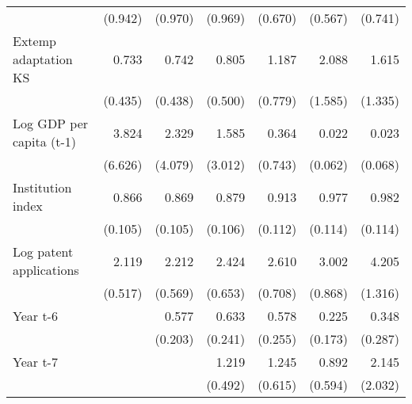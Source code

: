 \begin{table}[htbp]
\begin{tabular}{l*{6}{D{.}{.}{-1}}}
                    &     (0.942)         &     (0.970)         &     (0.969)         &     (0.670)         &     (0.567)         &     (0.741)         \\
\addlinespace
Extemp adaptation KS&       0.733         &       0.742         &       0.805         &       1.187         &       2.088         &       1.615         \\
                    &     (0.435)         &     (0.438)         &     (0.500)         &     (0.779)         &     (1.585)         &     (1.335)         \\
\addlinespace
Log GDP per capita (t-1)&       3.824         &       2.329         &       1.585         &       0.364         &       0.022         &       0.023         \\
                    &     (6.626)         &     (4.079)         &     (3.012)         &     (0.743)         &     (0.062)         &     (0.068)         \\
\addlinespace
Institution index   &       0.866         &       0.869         &       0.879         &       0.913         &       0.977         &       0.982         \\
                    &     (0.105)         &     (0.105)         &     (0.106)         &     (0.112)         &     (0.114)         &     (0.114)         \\
\addlinespace
Log patent applications&       2.119\sym{***}&       2.212\sym{***}&       2.424\sym{***}&       2.610\sym{***}&       3.002\sym{***}&       4.205\sym{***}\\
                    &     (0.517)         &     (0.569)         &     (0.653)         &     (0.708)         &     (0.868)         &     (1.316)         \\
\addlinespace
Year t-6            &                     &       0.577\sym{\%}  &       0.633         &       0.578         &       0.225\sym{*}  &       0.348         \\
                    &                     &     (0.203)         &     (0.241)         &     (0.255)         &     (0.173)         &     (0.287)         \\
\addlinespace
Year t-7            &                     &                     &       1.219         &       1.245         &       0.892         &       2.145         \\
                    &                     &                     &     (0.492)         &     (0.615)         &     (0.594)         &     (2.032)         \\

\end{tabular}
\end{table}
